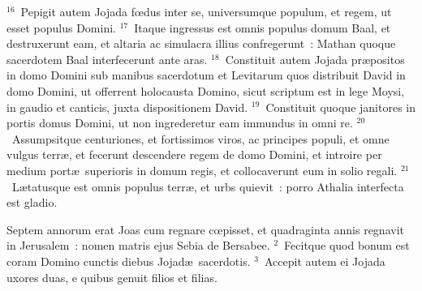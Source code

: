 ${}^{16}$~Pepigit autem Jojada fœdus inter se, universumque populum, et regem, ut esset populus Domini.
${}^{17}$~Itaque ingressus est omnis populus domum Baal, et destruxerunt eam, et altaria ac simulacra illius confregerunt~: Mathan quoque sacerdotem Baal interfecerunt ante aras.
${}^{18}$~Constituit autem Jojada pr\ae positos in domo Domini sub manibus sacerdotum et Levitarum quos distribuit David in domo Domini, ut offerrent holocausta Domino, sicut scriptum est in lege Moysi, in gaudio et canticis, juxta dispositionem David.
${}^{19}$~Constituit quoque janitores in portis domus Domini, ut non ingrederetur eam immundus in omni re.
${}^{20}$~Assumpsitque centuriones, et fortissimos viros, ac principes populi, et omne vulgus terr\ae , et fecerunt descendere regem de domo Domini, et introire per medium port\ae\ superioris in domum regis, et collocaverunt eum in solio regali.
${}^{21}$~L\ae tatusque est omnis populus terr\ae , et urbs quievit~: porro Athalia interfecta est gladio.

\lettrine[lines=10,image=true,loversize=0.05,lraise=-0.03]{S}{}eptem annorum erat Joas cum regnare cœpisset, et quadraginta annis regnavit in Jerusalem~: nomen matris ejus Sebia de Bersabee.
${}^{2}$~Fecitque quod bonum est coram Domino cunctis diebus Jojad\ae\ sacerdotis.
${}^{3}$~Accepit autem ei Jojada uxores duas, e quibus genuit filios et filias.


